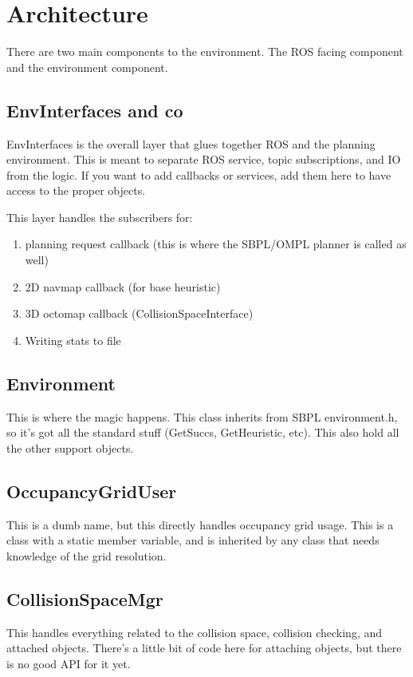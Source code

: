 \documentclass{article}
\begin{document}
\section{Architecture}

There are two main components to the environment. The ROS facing component and the environment component.

\subsection{EnvInterfaces and co}
EnvInterfaces is the overall layer that glues together ROS and the planning
environment. This is meant to separate ROS service, topic subscriptions, and IO
from the logic. If you want to add callbacks or services, add them here to have
access to the proper objects.

This layer handles the subscribers for:
\begin{enumerate}
		\item planning request callback (this is where the SBPL/OMPL planner is
        called as well)
		\item 2D navmap callback (for base heuristic)
		\item 3D octomap callback (CollisionSpaceInterface)
		\item Writing stats to file
\end{enumerate}

\subsection{Environment}
This is where the magic happens. This class inherits from SBPL environment.h, so
it's got all the standard stuff (GetSuccs, GetHeuristic, etc). This also hold
all the other support objects. 

\subsection{OccupancyGridUser}
This is a dumb name, but this directly handles occupancy grid usage. This is a
class with a static member variable, and is inherited by any class that needs
knowledge of the grid resolution.

\subsection{CollisionSpaceMgr}
This handles everything related to the collision space, collision checking, and
attached objects. There's a little bit of code here for attaching objects, but
there is no good API for it yet.
\end{document}
